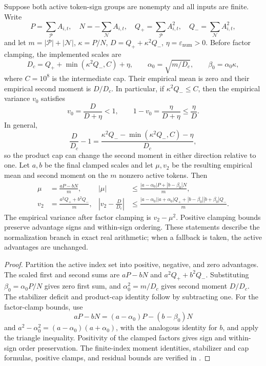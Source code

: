 \begin{proposition}
\label{prop:normalization-safeguards}
Suppose both active token-sign groups are nonempty and all inputs are finite.
Write
\[
P=\sum_{\mathcal P}A_{i,t},\quad N=-\sum_{\mathcal N}A_{i,t},\quad
Q_+=\sum_{\mathcal P}A_{i,t}^2,\quad Q_-=\sum_{\mathcal N}A_{i,t}^2,
\]
and let $m=|\mathcal P|+|\mathcal N|$, $\kappa=P/N$,
$D=Q_++\kappa^2Q_-$, $\eta=\varepsilon_{\mathrm{num}}>0$.
Before factor clamping, the implemented scales are
\[
D_c=Q_++\min(\kappa^2Q_-,C)+\eta,\qquad
\alpha_0=\sqrt{m/D_c},\qquad \beta_0=\alpha_0\kappa,
\]
where $C=10^8$ is the intermediate cap. Their empirical mean is zero and
their empirical second moment is $D/D_c$. In particular, if
$\kappa^2Q_-\le C$, then the empirical variance $v_0$ satisfies
\begin{equation}
    v_0=\frac{D}{D+\eta}<1,\qquad
    1-v_0=\frac{\eta}{D+\eta}\le\frac{\eta}{D}.
    \label{eq:normalization-stabilizer-deficit}
\end{equation}
In general,
\[
    \frac{D}{D_c}-1
    =\frac{\kappa^2Q_- -\min(\kappa^2Q_-,C)-\eta}{D_c},
\]
so the product cap can change the second moment in either direction relative to one.
Let $a,b$ be the final clamped scales and let $\mu,v_2$ be the resulting
empirical mean and second moment on the $m$ nonzero active tokens. Then
\begin{align*}
    \mu&=\frac{aP-bN}{m},
    &|\mu|&\le\frac{|a-\alpha_0|P+|b-\beta_0|N}{m},\\
    v_2&=\frac{a^2Q_++b^2Q_-}{m},
    &\left|v_2-\frac{D}{D_c}\right|
    &\le\frac{|a-\alpha_0||a+\alpha_0|Q_+
               +|b-\beta_0||b+\beta_0|Q_-}{m}.
\end{align*}
The empirical variance after factor clamping is $v_2-\mu^2$.
Positive clamping bounds preserve advantage signs and within-sign ordering.
These statements describe the normalization branch in exact real arithmetic;
when a fallback is taken, the active advantages are unchanged.
\end{proposition}

\begin{proof}
Partition the active index set into positive, negative, and zero advantages.
The scaled first and second sums are $aP-bN$ and $a^2Q_++b^2Q_-$.
Substituting $\beta_0=\alpha_0P/N$ gives zero first sum, and
$\alpha_0^2=m/D_c$ gives second moment $D/D_c$.
The stabilizer deficit and product-cap identity follow by subtracting one.
For the factor-clamp bounds, use
\[
aP-bN=(a-\alpha_0)P-(b-\beta_0)N
\]
and $a^2-\alpha_0^2=(a-\alpha_0)(a+\alpha_0)$, with the analogous identity
for $b$, and apply the triangle inequality. Positivity of the clamped
factors gives sign and within-sign order preservation.
The finite-index moment identities, stabilizer and cap formulas, positive
clamps, and residual bounds are verified in
.
\end{proof}

